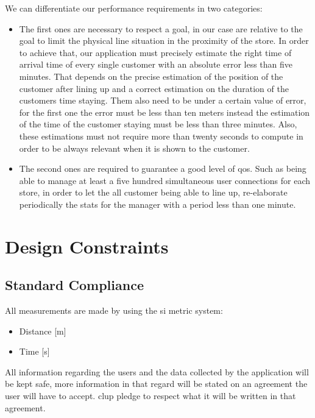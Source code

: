 We can differentiate our performance requirements in two categories:
\begin{itemize}
	\item The first ones are necessary to respect a goal, in our case are relative to the goal to limit the physical line situation in the proximity of the store. In 			order to achieve that, our application must precisely estimate the right time of arrival time of every single customer with an absolute error less than five 			minutes. That depends on the precise estimation of the position of the customer after lining up and a correct estimation on the duration of the customers time staying. Them also need to be under a certain value of error, for the first one the error must be less than ten meters instead the estimation of the time 	of the customer staying must be less than three minutes. Also, these estimations must not require more than twenty seconds to compute in order to be always relevant when it is shown to the customer.
	\item The second ones are required to guarantee a good level of \gls{qos}. Such as being able to manage at least a five hundred simultaneous user connections for each store, in order to let the all customer being able to line up, re-elaborate periodically the stats for the manager with a period less than one minute.

\end{itemize}
	

\section{Design Constraints}

\subsection{Standard Compliance}

All measurements are made by using the \gls{si} metric system: 
\begin{itemize}
	\item Distance [m]
	\item Time [s]
\end{itemize} 
All information regarding the users and the data collected by the application will be kept safe, more information in that regard will be stated on an agreement the user will have to accept. \gls{clup} pledge to respect what it will be written in that agreement. \\

